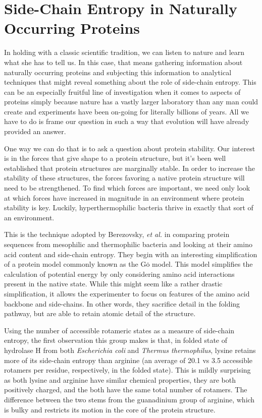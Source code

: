 \section*{Side-Chain Entropy in Naturally Occurring Proteins}
\label{sec:side_chain_entropy_of_x_ray_structures}
In holding with a classic scientific tradition, we can listen to nature and learn what she has to tell us. In this case, that means gathering information about naturally occurring proteins and subjecting this information to analytical techniques that might reveal something about the role of side-chain entropy. This can be an especially fruitful line of investigation when it comes to aspects of proteins simply because nature has a vastly larger laboratory than any man could create and experiments have been on-going for literally billions of years. All we have to do is frame our question in such a way that evolution will have already provided an answer.

One way we can do that is to ask a question about protein stability. Our interest is in the forces that give shape to a protein structure, but it's been well established that protein structures are marginally stable. In order to increase the stability of these structures, the forces favoring a native protein structure will need to be strengthened. To find which forces are important, we need only look at which forces have increased in magnitude in an environment where protein stability is key. Luckily, hyperthermophilic bacteria thrive in exactly that sort of an environment.

This is the technique adopted by Berezovsky, \emph{et al.}\cite{Berezovsky:2005p40} in comparing protein sequences from mesophilic and thermophilic bacteria and looking at their amino acid content and side-chain entropy. They begin with an interesting simplification of a protein model commonly known as the $\mathrm{G\bar{o}}$ model. This model simplifies the calculation of potential energy by only considering amino acid interactions present in the native state. While this might seem like a rather drastic simplification, it allows the experimenter to focus on features of the amino acid backbone and side-chains. In other words, they sacrifice detail in the folding pathway, but are able to retain atomic detail of the structure.

Using the number of accessible rotameric states as a measure of side-chain entropy, the first observation this group makes is that, in folded state of hydrolase H from both \emph{Escherichia coli} and \emph{Thermus thermophilus}, lysine retains more of its side-chain entropy than arginine (an average of 20.1 vs 3.5 accessible rotamers per residue, respectively, in the folded state). This is mildly surprising as both lysine and arginine have similar chemical properties, they are both positively charged, and the both have the same total number of rotamers. The difference between the two stems from the guanadinium group of arginine, which is bulky and restricts its motion in the core of the protein structure.


